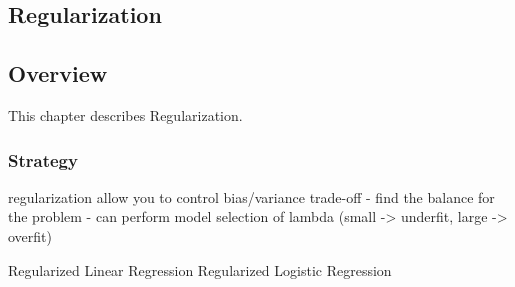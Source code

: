 

\renewcommand{\bibsection}{\subsection{\bibname}}
\begin{bibunit}

\chapter{Regularization}
\label{ch:regularization}

\section{Overview}
This chapter describes Regularization.


\subsection{Strategy}

regularization allow you to control bias/variance trade-off
- find the balance for the problem
- can perform model selection of lambda (small -> underfit, large -> overfit)

Regularized Linear Regression
Regularized Logistic Regression


\end{bibunit}
